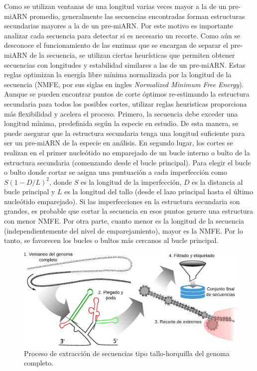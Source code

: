 Como se utilizan ventanas de una longitud varias veces mayor a la de un pre-miARN promedio, generalmente las secuencias encontradas forman estructuras
secundarias mayores a la de un pre-miARN. Por este motivo es importante analizar cada secuencia para detectar si es necesario un recorte. Como aún se desconoce
el funcionamiento de las enzimas que se encargan de separar el pre-miARN de la secuencia, se utilizan ciertas heurísticas que permiten obtener secuencias con
longitudes y estabilidad similares a las de un pre-miARN. Estas reglas optimizan la energía libre mínima normalizada por la longitud de la secuencia (NMFE, por
sus siglas en ingles \textit{Normalized Minimum Free Energy}). Aunque se pueden encontrar puntos de corte óptimos re-estimando la estructura secundaria para
todos los posibles cortes, utilizar reglas heuristicas proporciona más flexibilidad y acelera el proceso. Primero, la secuencia debe exceder una longitud
mínima, predefinida según la especie en estudio. De esta manera, se puede asegurar que la estructura secundaria tenga una longitud suficiente para ser un
pre-miARN de la especie en análisis. En segundo lugar, los cortes se realizan en el primer nucleótido no emparejado de un bucle interno o bulto de la
estructura secundaria (comenzando desde el bucle principal). Para elegir el bucle o bulto donde cortar se asigna una puntuación a cada imperfección como $ S (1
- D / L) ^ 2 $, donde $ S $ es la longitud de la imperfección, $ D $ es la distancia al bucle principal y $ L $ es la longitud del tallo (desde el lazo
principal hasta el último nucleótido emparejado). Si las imperfecciones en la estructura secundaria son grandes, es probable que cortar la secuencia en esos
puntos genere una estructura con menor NMFE. Por otra parte, cuanto menor es la longitud de la secuencia (independientemente del nivel de emparejamiento), mayor
es la NMFE. Por lo tanto, se favorecen los bucles o bultos más cercanos al bucle principal.

\begin{figure}[tpb]
	\centering
	\includegraphics[width=\textwidth]{fig/hextractor.eps}
	\caption[Extracción de secuencias tipo tallo-horquilla]{Proceso de extracción de secuencias tipo tallo-horquilla del genoma completo.}
	\label{fig:hextractor}
\end{figure}


